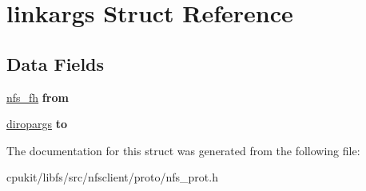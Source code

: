 \hypertarget{structlinkargs}{}\section{linkargs Struct Reference}
\label{structlinkargs}
\subsection*{Data Fields}
\begin{DoxyCompactItemize}
\item 
\mbox{\label{structlinkargs_a35034aff854cbd9d65e251296019501a}} 
\mbox{\hyperlink{structnfs__fh}{nfs\+\_\+fh}} {\bfseries from}
\item 
\mbox{\label{structlinkargs_a4ed7a8d62a890350de3dff230bf9e0fd}} 
\mbox{\hyperlink{structdiropargs}{diropargs}} {\bfseries to}
\end{DoxyCompactItemize}


The documentation for this struct was generated from the following file\+:\begin{DoxyCompactItemize}
\item 
cpukit/libfs/src/nfsclient/proto/nfs\+\_\+prot.\+h\end{DoxyCompactItemize}
